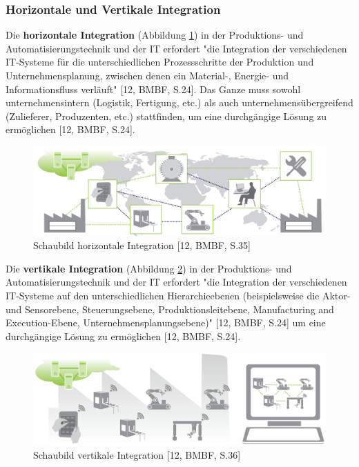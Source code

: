 \subsubsection{Horizontale und Vertikale Integration}\label{sec:HorizontaleVertikaleIntegration}
Die \textbf{horizontale Integration} (Abbildung \ref{fig:HorizontaleIntegration}) in der Produktions- und Automatisierungstechnik und der IT erfordert "die Integration der verschiedenen IT-Systeme für die unterschiedlichen Prozessschritte der Produktion und Unternehmensplanung, zwischen denen ein Material-, Energie- und Informationsfluss verläuft" [12, BMBF, S.24]. Das Ganze muss sowohl unternehmensintern (Logistik, Fertigung, etc.) als auch unternehmensübergreifend (Zulieferer, Produzenten, etc.) stattfinden, um eine durchgängige Lösung zu ermöglichen [12, BMBF, S.24].
\begin{figure}[h]
	\centering
	\includegraphics[width=1\linewidth]{Bilder/A3_HorizontaleIntegration}
	\caption{Schaubild horizontale Integration [12, BMBF, S.35]}
	\label{fig:HorizontaleIntegration}
\end{figure}
\newline
\noindent Die \textbf{vertikale Integration} (Abbildung \ref{fig:VertikaleIntegration}) in der Produktions- und Automatisierungstechnik und der IT erfordert "die Integration der verschiedenen IT-Systeme auf den unterschiedlichen Hierarchieebenen (beispielsweise die Aktor- und Sensorebene, Steuerungsebene, Produktionsleitebene, Manufacturing and Execution-Ebene, Unternehmensplanungsebene)" [12, BMBF, S.24] um eine durchgängige Lösung zu ermöglichen [12, BMBF, S.24].
\begin{figure}[h]
	\centering
	\includegraphics[width=1\linewidth]{Bilder/A4_VertikaleIntegration}
	\caption{Schaubild vertikale Integration [12, BMBF, S.36]}
	\label{fig:VertikaleIntegration}
\end{figure}

